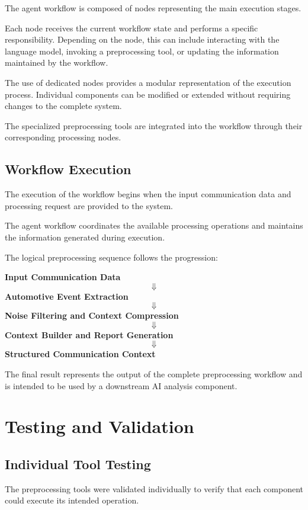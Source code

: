 The agent workflow is composed of nodes representing the main execution stages.

Each node receives the current workflow state and performs a specific responsibility. Depending on the node, this can include interacting with the language model, invoking a preprocessing tool, or updating the information maintained by the workflow.

The use of dedicated nodes provides a modular representation of the execution process. Individual components can be modified or extended without requiring changes to the complete system.

The specialized preprocessing tools are integrated into the workflow through their corresponding processing nodes.

\subsection{Workflow Execution}

The execution of the workflow begins when the input communication data and processing request are provided to the system.

The agent workflow coordinates the available processing operations and maintains the information generated during execution.

The logical preprocessing sequence follows the progression:

\begin{center}
\textbf{Input Communication Data}
\[
\Downarrow
\]
\textbf{Automotive Event Extraction}
\[
\Downarrow
\]
\textbf{Noise Filtering and Context Compression}
\[
\Downarrow
\]
\textbf{Context Builder and Report Generation}
\[
\Downarrow
\]
\textbf{Structured Communication Context}
\end{center}

The final result represents the output of the complete preprocessing workflow and is intended to be used by a downstream AI analysis component.

\section{Testing and Validation}

\subsection{Individual Tool Testing}

The preprocessing tools were validated individually to verify that each component could execute its intended operation.

